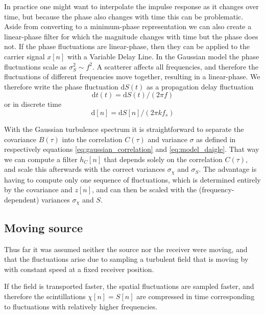 In practice one might want to interpolate the impulse response as it changes
over time, but because the phase also changes with time this can be problematic.
Aside from converting to a minimum-phase representation we can also create a
linear-phase filter for which the magnitude changes with time but the phase does
not. If the phase fluctuations are linear-phase, then they can be applied to the
carrier signal $x[n]$ with a Variable Delay Line. In the Gaussian model the
phase fluctuations scale as $\sigma_S^2 \sim f^2$. A scatterer affects all frequencies, and therefore the fluctuations of different frequencies move together, resulting in a linear-phase.
We therefore write the phase fluctuation $\mathrm{d}S(t)$ as a propagation delay fluctuation
\begin{equation}\label{eq:time_delay_fluctuations}
\mathrm{d}t(t) = \mathrm{d}S(t) / (2 \pi f)
\end{equation}
or in discrete time
\begin{equation}
 \mathrm{d}[n] = \mathrm{d}S[n] / (2 \pi k f_s)
\end{equation}

With the Gaussian turbulence spectrum it is straightforward to separate the
covariance $B(\tau)$ into the correlation $C(\tau)$ and variance $\sigma$ as defined in respectively equations \eqref{eq:gaussian_correlation} and \eqref{eq:model_daigle}. That
way we can compute a filter $h_C[n]$ that depends solely on the correlation
$C(\tau)$, and scale this afterwards with the correct variances $\sigma_{\chi}$
and $\sigma_{S}$. The advantage is having to compute only one sequence of
fluctuations, which is determined entirely by the covariance and $z[n]$, and can
then be scaled with the (frequency-dependent) variances $\sigma_{\chi}$ and
$S$.

\subsection{Moving source}
Thus far it was assumed neither the source nor the receiver were moving, and
that the fluctuations arise due to sampling a turbulent field that is moving
by with constant speed at a fixed receiver position.

If the field is transported faster, the spatial fluctuations are sampled faster,
and therefore the scintillations $\chi[n]=S[n]$ are compressed in time
corresponding to fluctuations with relatively higher frequencies.

